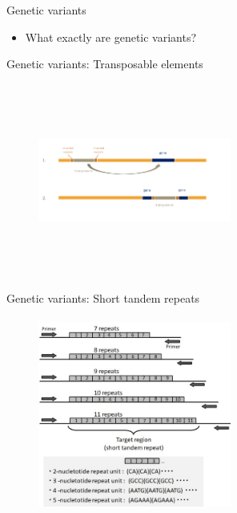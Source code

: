 \documentclass[t,10pt]{beamer}
\begin{document}
\begin{frame}[label={sec:orgheadline26}]{Genetic variants}
\begin{itemize}
\item What exactly are genetic variants?
\end{itemize}
\end{frame}
\begin{frame}[label={sec:orgheadline27}]{Genetic variants: Transposable elements}
\begin{figure}[htb]
\centering
\includegraphics[width=2.5in,height=2.5in]{./Figures/Tranposons.png}
\end{figure}
\end{frame}

\begin{frame}[label={sec:orgheadline28}]{Genetic variants: Short tandem repeats}
\begin{figure}[htb]
\centering
\includegraphics[width=2.5in,height=2.5in]{./Figures/STR.jpg}
\end{figure}
\end{frame}
\end{document}
